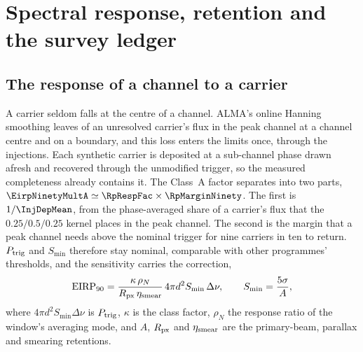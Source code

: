 \section{Spectral response, retention and the survey ledger}
\label{app:conventions}

\subsection{The response of a channel to a carrier}

A carrier seldom falls at the centre of a channel. ALMA's online Hanning
smoothing \citep{ALMAHandbook} leaves \HanBest{} of an unresolved carrier's
flux in the peak channel at a channel centre and \HanWorst{} on a boundary,
and this loss enters the limits once, through the injections. Each synthetic
carrier is deposited at a sub-channel phase drawn afresh and recovered
through the unmodified trigger, so the measured completeness already
contains it. The Class~A factor separates into two parts,
$\EirpNinetyMultA\simeq\RpRespFac\times\RpMarginNinety$. The first is
$1/\InjDepMean$, from the phase-averaged share of a carrier's flux that the
$0.25/0.5/0.25$ kernel places in the peak channel. The second is the margin
that a peak channel needs above the nominal trigger for nine carriers in ten
to return. $P_{\rm trig}$ and $S_{\min}$ therefore stay nominal, comparable
with other programmes' thresholds, and the sensitivity carries the
correction,
\begin{equation}
\mathrm{EIRP}_{90}=\frac{\kappa\,\rho_N}{R_{\rm px}\,\eta_{\rm smear}}\,
4\pi d^{2}S_{\min}\,\Delta\nu,\qquad S_{\min}=\frac{5\sigma}{A},
\label{eq:eirp90}
\end{equation}
where $4\pi d^{2}S_{\min}\Delta\nu$ is $P_{\rm trig}$, $\kappa$ is the class
factor, $\rho_N$ the response ratio of the window's averaging mode, and $A$, $R_{\rm px}$ and $\eta_{\rm smear}$ are the
primary-beam, parallax and smearing retentions.

